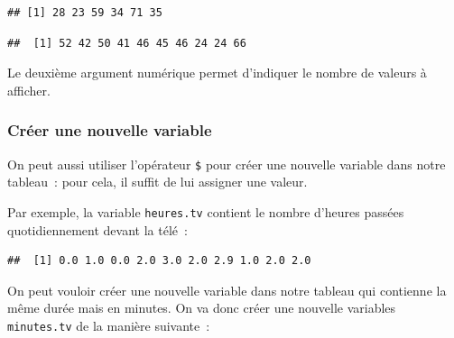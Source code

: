 \documentclass[12pt,]{book}
\newenvironment{Shaded}{\begin{snugshade}}{\end{snugshade}}
\newcommand{\DecValTok}[1]{\textcolor[rgb]{0.06,0.06,0.06}{#1}}
\newcommand{\KeywordTok}[1]{\textcolor[rgb]{0.27,0.27,0.27}{\textbf{#1}}}
\newcommand{\NormalTok}[1]{#1}
\newcommand{\OperatorTok}[1]{\textcolor[rgb]{0.43,0.43,0.43}{\textbf{#1}}}
\newcommand{\StringTok}[1]{\textcolor[rgb]{0.5,0.5,0.5}{#1}}
\begin{document}
\begin{verbatim}
## [1] 28 23 59 34 71 35
\end{verbatim}

\begin{Shaded}
\end{Shaded}

\begin{verbatim}
##  [1] 52 42 50 41 46 45 46 24 24 66
\end{verbatim}

Le deuxième argument numérique permet d'indiquer le nombre de valeurs à afficher.

\hypertarget{cruxe9er-une-nouvelle-variable}{%
\subsubsection{Créer une nouvelle variable}\label{cruxe9er-une-nouvelle-variable}}

On peut aussi utiliser l'opérateur \texttt{\$} pour créer une nouvelle variable dans notre tableau~: pour cela, il suffit de lui assigner une valeur.

Par exemple, la variable \texttt{heures.tv} contient le nombre d'heures passées quotidiennement devant la télé~:

\begin{Shaded}
\end{Shaded}

\begin{verbatim}
##  [1] 0.0 1.0 0.0 2.0 3.0 2.0 2.9 1.0 2.0 2.0
\end{verbatim}

On peut vouloir créer une nouvelle variable dans notre tableau qui contienne la même durée mais en minutes. On va donc créer une nouvelle variables \texttt{minutes.tv} de la manière suivante~:

\begin{Shaded}
\end{Shaded}
\end{document}

